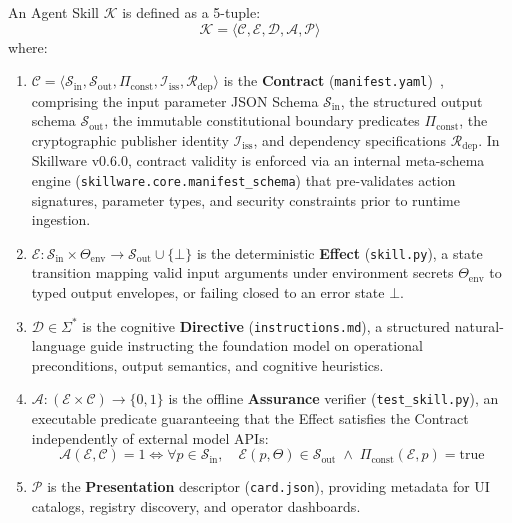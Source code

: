 \begin{definition}
An Agent Skill $\mathcal{K}$ is defined as a 5-tuple:
\begin{equation}
\label{eq:skill_tuple}
\mathcal{K} = \langle \mathcal{C}, \mathcal{E}, \mathcal{D}, \mathcal{A}, \mathcal{P} \rangle
\end{equation}
where:
\begin{enumerate}[leftmargin=*]
  \item $\mathcal{C} = \langle \mathcal{S}_{\text{in}}, \mathcal{S}_{\text{out}}, \Pi_{\text{const}}, \mathcal{I}_{\text{iss}}, \mathcal{R}_{\text{dep}} \rangle$ is the \textbf{Contract} (\texttt{manifest.yaml})~\cite{hoare1969axiomatic, skillware2026framework}, comprising the input parameter JSON Schema $\mathcal{S}_{\text{in}}$, the structured output schema $\mathcal{S}_{\text{out}}$, the immutable constitutional boundary predicates $\Pi_{\text{const}}$, the cryptographic publisher identity $\mathcal{I}_{\text{iss}}$, and dependency specifications $\mathcal{R}_{\text{dep}}$. In Skillware v0.6.0, contract validity is enforced via an internal meta-schema engine (\texttt{skillware.core.\allowbreak manifest\_schema}) that pre-validates action signatures, parameter types, and security constraints prior to runtime ingestion.
  \item $\mathcal{E}: \mathcal{S}_{\text{in}} \times \Theta_{\text{env}} \to \mathcal{S}_{\text{out}} \cup \{\bot\}$ is the deterministic \textbf{Effect} (\texttt{skill.py}), a state transition mapping valid input arguments under environment secrets $\Theta_{\text{env}}$ to typed output envelopes, or failing closed to an error state $\bot$.
  \item $\mathcal{D} \in \Sigma^*$ is the cognitive \textbf{Directive} (\texttt{instructions.md}), a structured natural-language guide instructing the foundation model on operational preconditions, output semantics, and cognitive heuristics.
  \item $\mathcal{A}: (\mathcal{E} \times \mathcal{C}) \to \{0, 1\}$ is the offline \textbf{Assurance} verifier (\texttt{test\_skill.py}), an executable predicate guaranteeing that the Effect satisfies the Contract independently of external model APIs:
  \begin{equation}
  \label{eq:assurance}
  \mathcal{A}(\mathcal{E}, \mathcal{C}) = 1 \iff \forall p \in \mathcal{S}_{\text{in}}, \quad \mathcal{E}(p, \Theta) \in \mathcal{S}_{\text{out}} \;\land\; \Pi_{\text{const}}(\mathcal{E}, p) = \text{true}
  \end{equation}
  \item $\mathcal{P}$ is the \textbf{Presentation} descriptor (\texttt{card.json}), providing metadata for UI catalogs, registry discovery, and operator dashboards.
\end{enumerate}
\end{definition}

